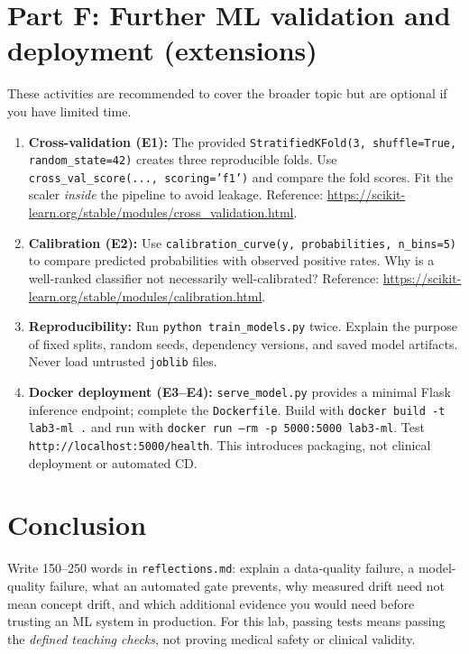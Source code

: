 \documentclass[11pt,a4paper]{article}
\begin{document}
\section{Part F: Further ML validation and deployment (extensions)}
These activities are recommended to cover the broader topic but are optional if you have limited time.
\begin{enumerate}
\item \textbf{Cross-validation (E1):} The provided \texttt{StratifiedKFold(3, shuffle=True, random\_state=42)} creates three reproducible folds. Use \texttt{cross\_val\_score(..., scoring='f1')} and compare the fold scores. Fit the scaler \emph{inside} the pipeline to avoid leakage. Reference: \url{https://scikit-learn.org/stable/modules/cross_validation.html}.
\item \textbf{Calibration (E2):} Use \texttt{calibration\_curve(y, probabilities, n\_bins=5)} to compare predicted probabilities with observed positive rates. Why is a well-ranked classifier not necessarily well-calibrated? Reference: \url{https://scikit-learn.org/stable/modules/calibration.html}.
\item \textbf{Reproducibility:} Run \texttt{python train\_models.py} twice. Explain the purpose of fixed splits, random seeds, dependency versions, and saved model artifacts. Never load untrusted \texttt{joblib} files.
\item \textbf{Docker deployment (E3--E4):} \texttt{serve\_model.py} provides a minimal Flask inference endpoint; complete the \texttt{Dockerfile}. Build with \texttt{docker build -t lab3-ml .} and run with \texttt{docker run --rm -p 5000:5000 lab3-ml}. Test \texttt{http://localhost:5000/health}. This introduces packaging, not clinical deployment or automated CD.
\end{enumerate}
\section{Conclusion}
Write 150--250 words in \texttt{reflections.md}: explain a data-quality failure, a model-quality failure, what an automated gate prevents, why measured drift need not mean concept drift, and which additional evidence you would need before trusting an ML system in production. For this lab, passing tests means passing the \emph{defined teaching checks}, not proving medical safety or clinical validity.
\end{document}
